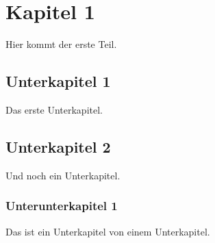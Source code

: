 \documentclass[a4paper, pdftex, 12pt, ngerman]{article}
\begin{document}
\tableofcontents
\newpage
\section{Kapitel 1}
Hier kommt der erste Teil.
\subsection{Unterkapitel 1}
Das erste Unterkapitel.
\subsection{Unterkapitel 2}
Und noch ein Unterkapitel.
\subsubsection{Unterunterkapitel 1}
Das ist ein Unterkapitel von einem Unterkapitel.
\end{document}
